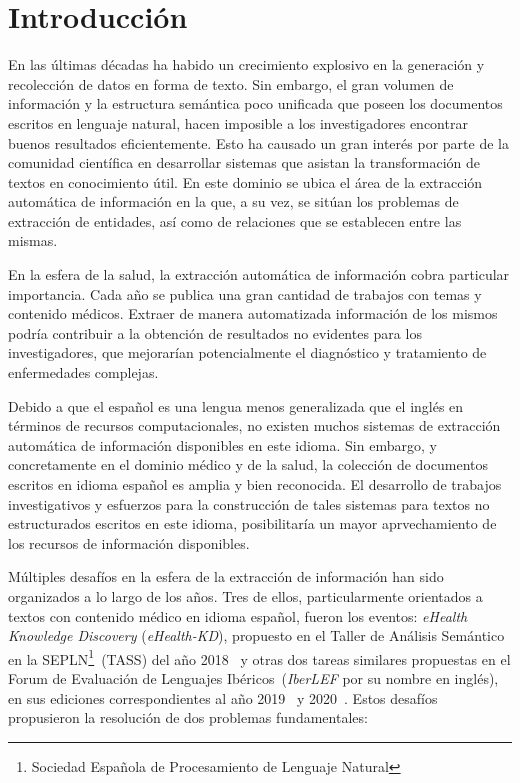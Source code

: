 \chapter*{Introducción}\label{chapter:introduction}

En las últimas décadas ha habido un crecimiento explosivo en la generación y recolección de datos en forma de texto.
Sin embargo, el gran volumen de información y la estructura semántica poco unificada que poseen los documentos escritos en lenguaje natural, hacen imposible a los investigadores encontrar buenos resultados eficientemente.
Esto ha causado un gran interés por parte de la comunidad científica en desarrollar sistemas que asistan la transformación de textos en conocimiento útil.
En este dominio se ubica el área de la extracción automática de información en la que, a su vez, se sitúan los problemas de extracción de entidades, así como de relaciones que se establecen entre las mismas.

En la esfera de la salud, la extracción automática de información cobra particular importancia.
Cada año se publica una gran cantidad de trabajos con temas y contenido médicos.
Extraer de manera automatizada información de los mismos podría contribuir a la obtención de resultados no evidentes para los investigadores, que mejorarían potencialmente el diagnóstico y tratamiento de enfermedades complejas.

Debido a que el español es una lengua menos generalizada que el inglés en términos de recursos computacionales, no existen muchos sistemas de extracción automática de información disponibles en este idioma.
Sin embargo, y concretamente en el dominio médico y de la salud, la colección de documentos escritos en idioma español es amplia y bien reconocida.
El desarrollo de trabajos investigativos y esfuerzos para la construcción de tales sistemas para textos no estructurados escritos en este idioma, posibilitaría un mayor aprvechamiento de los recursos de información disponibles.

Múltiples desafíos en la esfera de la extracción de información han sido organizados a lo largo de los años.
Tres de ellos, particularmente orientados a textos con contenido médico en idioma español, fueron los eventos: \emph{eHealth Knowledge Discovery} (\textit{eHealth-KD}), propuesto en el Taller de Análisis Semántico en la SEPLN\footnote{Sociedad Española de Procesamiento de Lenguaje Natural}~(TASS) del año 2018~\cite{martinez2018overview} y otras dos tareas similares propuestas en el Forum de Evaluación de Lenguajes Ibéricos~(\textit{IberLEF} por su nombre en inglés), en sus ediciones correspondientes al año 2019~\cite{piad2019overview} y 2020~\cite{piad2020overview}.
Estos desafíos propusieron la resolución de dos problemas fundamentales:

